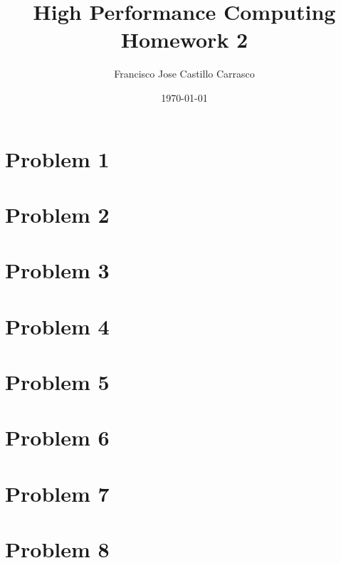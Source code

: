 




\title{High Performance Computing\\Homework 2}
\author{Francisco Jose Castillo Carrasco}
\date{\today}
\maketitle




\section*{Problem 1}


\section*{Problem 2}

\newpage
\section*{Problem 3}


\section*{Problem 4}


\section*{Problem 5}

\newpage
\section*{Problem 6}


\section*{Problem 7}


\section*{Problem 8}


